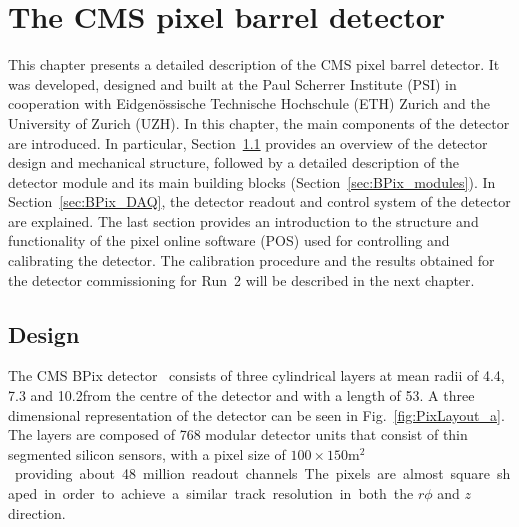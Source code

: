 \chapter{The CMS pixel barrel detector}
\label{ch:BPix}

This chapter presents a detailed description of the CMS pixel barrel detector.
It was developed, designed and built at the Paul Scherrer Institute (PSI) in cooperation with Eidgen{\"o}ssische Technische Hochschule (ETH) Zurich and the University of Zurich (UZH).
In this chapter, the main components of the detector are introduced. In particular, Section~\ref{sec:BPix_design} provides an overview of the detector design and mechanical structure, followed by a detailed description of the detector module and its main building blocks (Section~\ref{sec:BPix_modules}). In Section~\ref{sec:BPix_DAQ}, the detector readout and control system of the detector are explained.
The last section provides an introduction to the structure and functionality of the pixel online software (POS) used for controlling and calibrating the detector.
The calibration procedure and the results obtained for the detector commissioning for Run~2 will be described in the next chapter.

\section{Design}\label{sec:BPix_design}

The CMS BPix detector~\cite{Kastli2007724} consists of three cylindrical layers at mean radii of 4.4, 7.3 and 10.2\cm from the centre of the detector and with a length of 53\cm.
A three dimensional representation of the detector can be seen in Fig.~\ref{fig:PixLayout_a}.
The layers are composed of 768 modular detector units that consist of thin segmented silicon sensors, with a pixel size of $100\times150$\unit{m$^2$} providing about 48 million readout channels.
The pixels are almost square shaped in order to achieve a similar track resolution in both the $r\phi$ and $z$ direction.

